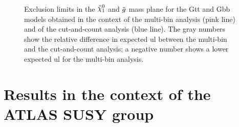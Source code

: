 \begin{figure}[htbp]
	\centering 
	\caption{Exclusion limits in the $\ninoone$ and $\tilde{g}$ mass plane
  		for the  Gtt and   Gbb models obtained
		in the context of the multi-bin analysis (pink line) and of the cut-and-count analysis (blue line). 
		The gray numbers show the relative difference in expected \gls{ul} between the multi-bin and the cut-and-count analysis: a negative number shows a lower expected \gls{ul} for the multi-bin analysis.}
	\label{fig:limits_GbbGtt_comp}
\end{figure}

\section{Results in the context of the ATLAS SUSY group}
